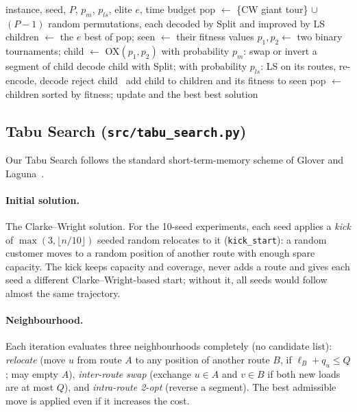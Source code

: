 \documentclass[11pt,a4paper]{article}
\theoremstyle{definition}
\theoremstyle{remark}
\newcommand{\code}[1]{\texttt{#1}}
\begin{document}
\begin{algorithm}[ht]
\caption{Memetic giant-tour GA}\label{alg:ga}
\begin{algorithmic}[1]
\Require instance, seed, $P$, $p_m$, $p_{ls}$, elite $e$, time budget
\State pop $\gets$ \{CW giant tour\} $\cup$ $(P-1)$ random permutations, each decoded by Split and improved by LS
  \State children $\gets$ the $e$ best of pop; seen $\gets$ their fitness values
    \State $p_1,p_2\gets$ two binary tournaments; child $\gets$ OX$(p_1,p_2)$
    \State with probability $p_m$: swap or invert a segment of child
    \State decode child with Split; with probability $p_{ls}$: LS on its routes, re-encode, decode
     reject child
    \Else\ add child to children and its fitness to seen \EndIf
  \EndWhile
  \State pop $\gets$ children sorted by fitness; update and  the best
\EndWhile
\State \Return best solution
\end{algorithmic}
\end{algorithm}

\subsection{Tabu Search (\code{src/tabu\_search.py})}
Our Tabu Search follows the standard short-term-memory scheme of Glover and
Laguna~\cite{glover1997}.

\paragraph{Initial solution.} The Clarke--Wright solution. For the 10-seed experiments, each
seed applies a \emph{kick} of $\max(3,\lfloor n/10\rfloor)$ seeded random relocates to it
(\code{kick\_start}): a random customer moves to a random position of another route with
enough spare capacity. The kick keeps capacity and coverage, never adds a route and gives
each seed a different Clarke--Wright-based start; without it, all seeds would follow almost
the same trajectory.

\paragraph{Neighbourhood.} Each iteration evaluates three neighbourhoods completely (no
candidate list):
\emph{relocate} (move $u$ from route $A$ to any position of another route $B$, if
$\ell_B+q_u\le Q$; may empty $A$), \emph{inter-route swap} (exchange $u\in A$ and $v\in B$
if both new loads are at most $Q$), and \emph{intra-route 2-opt} (reverse a segment). The
best admissible move is applied even if it increases the cost.
\end{document}
